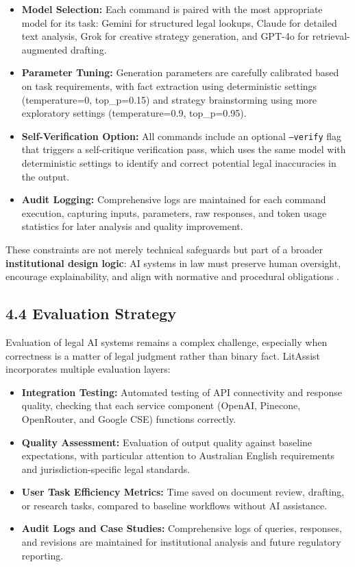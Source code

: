 \documentclass[12pt,a4paper]{article}
\begin{document}
\begin{itemize}
\item \textbf{Model Selection:} Each command is paired with the most appropriate model for its task: Gemini for structured legal lookups, Claude for detailed text analysis, Grok for creative strategy generation, and GPT-4o for retrieval-augmented drafting.

\item \textbf{Parameter Tuning:} Generation parameters are carefully calibrated based on task requirements, with fact extraction using deterministic settings (temperature=0, top\_p=0.15) and strategy brainstorming using more exploratory settings (temperature=0.9, top\_p=0.95).

\item \textbf{Self-Verification Option:} All commands include an optional \texttt{--verify} flag that triggers a self-critique verification pass, which uses the same model with deterministic settings to identify and correct potential legal inaccuracies in the output.

\item \textbf{Audit Logging:} Comprehensive logs are maintained for each command execution, capturing inputs, parameters, raw responses, and token usage statistics for later analysis and quality improvement.
\end{itemize}

These constraints are not merely technical safeguards but part of a broader \textbf{institutional design logic}: AI systems in law must preserve human oversight, encourage explainability, and align with normative and procedural obligations \cite{Wischmeyer2020}.

\subsection*{4.4 Evaluation Strategy}

Evaluation of legal AI systems remains a complex challenge, especially when correctness is a matter of legal judgment rather than binary fact. LitAssist incorporates multiple evaluation layers:

\begin{itemize}
\item \textbf{Integration Testing:} Automated testing of API connectivity and response quality, checking that each service component (OpenAI, Pinecone, OpenRouter, and Google CSE) functions correctly.

\item \textbf{Quality Assessment:} Evaluation of output quality against baseline expectations, with particular attention to Australian English requirements and jurisdiction-specific legal standards.

\item \textbf{User Task Efficiency Metrics:} Time saved on document review, drafting, or research tasks, compared to baseline workflows without AI assistance.

\item \textbf{Audit Logs and Case Studies:} Comprehensive logs of queries, responses, and revisions are maintained for institutional analysis and future regulatory reporting.
\end{itemize}
\end{document}
